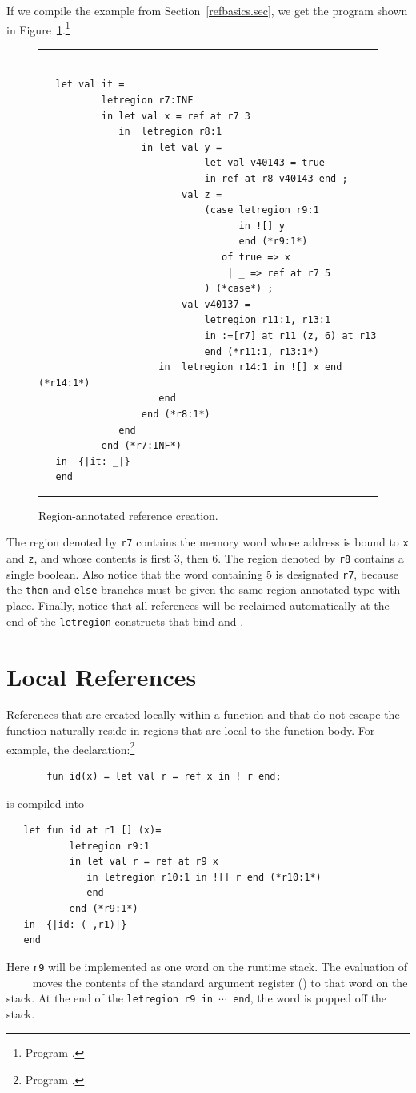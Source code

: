 \documentclass[12pt]{book}
\begin{document}
If we compile the example from Section~\ref{refbasics.sec}, we get the 
program shown in Figure~\ref{otherrefs.fig}.\footnote{Program .}
\begin{figure}
\hrule
\begin{verbatim}

   let val it = 
           letregion r7:INF 
           in let val x = ref at r7 3
              in  letregion r8:1 
                  in let val y = 
                             let val v40143 = true 
                             in ref at r8 v40143 end ; 
                         val z = 
                             (case letregion r9:1 
                                   in ![] y 
                                   end (*r9:1*) 
                                of true => x 
                                 | _ => ref at r7 5
                             ) (*case*) ; 
                         val v40137 = 
                             letregion r11:1, r13:1 
                             in :=[r7] at r11 (z, 6) at r13 
                             end (*r11:1, r13:1*)
                     in  letregion r14:1 in ![] x end (*r14:1*)
                     end  
                  end (*r8:1*)
              end  
           end (*r7:INF*)
   in  {|it: _|}
   end 
\end{verbatim}
\caption{Region-annotated reference creation.}
\label{otherrefs.fig}
\medskip
\hrule
\end{figure}
The region denoted by {\tt r7} contains the memory 
word whose address is bound to {\tt x} and {\tt z},
and whose contents is first 3, then 6.  The region denoted
by {\tt r8} contains a single boolean.
Also notice that the word containing 5 is
designated {\tt r7}, 
because the {\tt then} and {\tt else} branches must be given the same
region-annotated type with place. Finally, notice that all 
references will be reclaimed automatically
at the end of the {\tt letregion} constructs 
that bind  and .

\section{Local References}
References  that are created locally within a function and that do
not escape the function naturally reside in regions that are local to
the function body.
For example, the declaration:\footnote{Program .}
\begin{verbatim}
       fun id(x) = let val r = ref x in ! r end;
\end{verbatim}
is compiled into
\begin{verbatim}
   let fun id at r1 [] (x)= 
           letregion r9:1 
           in let val r = ref at r9 x 
              in letregion r10:1 in ![] r end (*r10:1*) 
              end  
           end (*r9:1*)
   in  {|id: (_,r1)|}
   end 
\end{verbatim}
Here {\tt r9} will be implemented as one word on the runtime stack. The
evaluation of ~~~~ moves the contents of the standard
argument register () to that word on the stack. At the
end of the {\tt letregion r9 in $\cdots$ end}, the word is popped off the stack.
\end{document}
